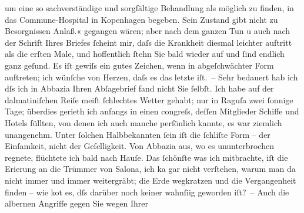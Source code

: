 \begin{ledgroupsized}[t]{13cm}
{{{                     um eine so sachverständige und sorgfältige Behandlung als möglich zu finden, in
                     das Commune-Hospital in
                        Kopenhagen begeben. Sein Zustand gibt nicht zu Besorgnissen
                     Anlaß.«}}}\label{K_L01034_1h} gegangen wären; aber nach dem ganzen Tun u auch nach der
               Schrift Ihres Briefes ſcheint mir, daſs die Krankheit diesmal leichter auftritt als
               die erſten Male, und hoffentlich ſtehn Sie bald wieder auf und ſind endlich ganz
               geſund. Es iſt gewiſs ein gutes Zeichen, wenn \label{K_L01034_2v}\label{K_L01034_2h} in abgeſchwächter Form auftreten; {\pb}ich wünſche von Herzen, daſs es das letzte iſt. –
               Sehr bedauert hab ich dſs ich in Abbazia Ihren
               Abſagebrief fand nicht Sie ſelbſt. Ich habe auf der dalmatiniſchen Reiſe meiſt ſchlechtes Wetter gehabt; nur in Raguſa zwei ſonnige Tage; überdies gerieth ich anfangs in einen
                  \label{K_L01034_3v}\label{K_L01034_3h}congreſs, deſſen Mitglieder Schiffe und Hotels füllten, von
               denen ich auch manche perſönlich kannte, es war ziemlich unangenehm. Unter ſolchen
                  Halb{\pb}bekannten ſein iſt die ſchli{\geminationm}ſte Form – der Einſamkeit, nicht der Geſelligkeit. Von
                  Abbazia aus, wo es ununterbrochen regnete,
               flüchtete ich bald nach Hauſe. Das ſchönſte was ich mitbrachte, iſt die Eri{\geminationn}erung an die Trümmer von Salona, ich ka{\geminationn} gar nicht verſtehen, warum man
               da nicht immer und immer weitergräbt; die Erde wegkratzen und die Vergangenheit
               finden – wie ko{\geminationm}t es, dſs darüber noch keiner wahnſi{\geminationn}ig {\pb}geworden
               iſt? –\pend
           \pstart
           Auch die albernen Angriffe gegen Sie wegen Ihrer \label{K_L01034_4v}
\end{ledgroupsized}

